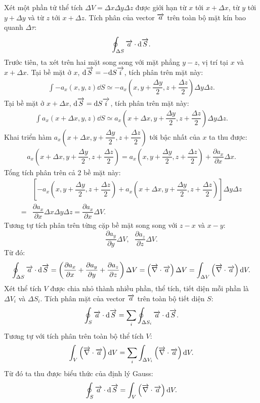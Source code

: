 \begin{appendices}
\begin{center}
\end{center}
Xét một phần tử thể tích $\Delta V=\Delta x\Delta y\Delta z$ được giới hạn từ $x$ tới $x+\Delta x$, từ $y$ tới $y+\Delta y$ và từ $z$ tới $x+\Delta z$. Tích phân của vector $\overrightarrow{a}$ trên toàn bộ mặt kín bao quanh $\Delta \tau$:
$$\oint_{\Delta S}\overrightarrow{a}\cdot\mathrm{d}\overrightarrow{S}.$$
Trước tiên, ta xét trên hai mặt song song với mặt phẳng $y-z$, vị trí tại $x$ và $x+\Delta x$. Tại bề mặt ở $x$, $\mathrm{d} \overrightarrow{S}=-\mathrm{d} S\overrightarrow{i}$, tích phân trên mặt này:
\begin{align*}
    \int -a_x(x,y,z)\dd S \simeq  -a_x\left(x,y+\dfrac{\Delta y}{2},z+\dfrac{\Delta z}{2}\right)\Delta y\Delta z.
\end{align*}
Tại bề mặt ở $x+\Delta x$, $\mathrm{d} \overrightarrow{S}=\mathrm{d} S\overrightarrow{i}$, tích phân trên mặt này:
\begin{align*}
    \int a_x(x+\Delta x,y,z)\dd S \simeq  a_x\left(x+\Delta x,y+\dfrac{\Delta y}{2},z+\dfrac{\Delta z}{2}\right)\Delta y\Delta z.
\end{align*}
Khai triển hàm $a_x\left(x+\Delta x,y+\dfrac{\Delta y}{2},z+\dfrac{\Delta z}{2}\right)$ tới bậc nhất của $x$ ta thu được:
\begin{align*}
    a_x\left(x+\Delta x,y+\dfrac{\Delta y}{2},z+\dfrac{\Delta z}{2}\right)=a_x\left(x,y+\dfrac{\Delta y}{2},z+\dfrac{\Delta z}{2}\right)+\dfrac{\partial a_x}{\partial x}\Delta x.
\end{align*}
Tổng tích phân trên cả 2 bề mặt này:
\begin{align*}
    &\left[-a_x\left(x,y+\dfrac{\Delta y}{2},z+\dfrac{\Delta z}{2}\right)+a_x\left(x+\Delta x,y+\dfrac{\Delta y}{2},z+\dfrac{\Delta z}{2}\right)\right]\Delta y\Delta z\\
    =&\dfrac{\partial a_x}{\partial x}\Delta x\Delta y\Delta z
    =\dfrac{\partial a_x}{\partial x}\Delta V.
\end{align*}
Tương tự tích phân trên từng cặp bề mặt song song với $z-x$ và $x-y$:
$$\dfrac{\partial a_y}{\partial y}\Delta V,\text{ }\dfrac{\partial a_z}{\partial z}\Delta V.$$
Từ đó:
$$\oint_{\Delta S}\overrightarrow{a}\cdot\mathrm{d}\overrightarrow{S}=\left(\dfrac{\partial a_x}{\partial x}+\dfrac{\partial a_y}{\partial y}+\dfrac{\partial a_z}{\partial z}\right)\Delta V=\left(\overrightarrow{\nabla}\cdot\overrightarrow{a}\right)\Delta V=\int_{\Delta V}\left(\overrightarrow{\nabla}\cdot\overrightarrow{a}\right)\mathrm{d} V.$$
Xét thể tích $V$ được chia nhỏ thành nhiều phần, thể tích, tiết diện mỗi phần là $\Delta V_i$ và $\Delta S_i$. Tích phân mặt của vector $\overrightarrow{a}$ trên toàn bộ tiết diện $S$:
$$\oint_{S}\overrightarrow{a}\cdot\mathrm{d}\overrightarrow{S}=\sum_i\oint_{\Delta S_i}\overrightarrow{a}\cdot\mathrm{d}\overrightarrow{S}.$$
Tương tự với tích phân trên toàn bộ thể tích $V$:
$$\int_{V}\left(\overrightarrow{\nabla}\cdot\overrightarrow{a}\right)\mathrm{d} V=\sum_i\int_{\Delta V_i}\left(\overrightarrow{\nabla}\cdot\overrightarrow{a}\right)\mathrm{d} V.$$
Từ đó ta thu được biểu thức của định lý Gauss:
$$\oint_{S}\overrightarrow{a}\cdot\mathrm{d}\overrightarrow{S}=\int_{V}\left(\overrightarrow{\nabla}\cdot\overrightarrow{a}\right)\mathrm{d} V.$$

\end{appendices}
